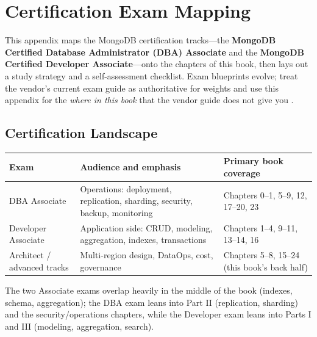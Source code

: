 \chapter{Certification Exam Mapping}
%
This appendix maps the MongoDB certification tracks---the \textbf{MongoDB Certified Database
Administrator (DBA) Associate} and the \textbf{MongoDB Certified Developer Associate}---onto the
chapters of this book, then lays out a study strategy and a self-assessment checklist. Exam
blueprints evolve; treat the vendor's current exam guide as authoritative for weights and use
this appendix for the \emph{where in this book} that the vendor guide does not give you
\cite{mongodbUniversityDocs}.

\section{Certification Landscape}
\begin{center}
\footnotesize
\begin{tabular}{@{}p{3.6cm}p{4.4cm}p{4.8cm}@{}}
\toprule
\textbf{Exam} & \textbf{Audience and emphasis} & \textbf{Primary book coverage} \\
\midrule
DBA Associate & Operations: deployment, replication, sharding, security, backup, monitoring & Chapters 0--1, 5--9, 12, 17--20, 23 \\
Developer Associate & Application side: CRUD, modeling, aggregation, indexes, transactions & Chapters 1--4, 9--11, 13--14, 16 \\
Architect / advanced tracks & Multi-region design, DataOps, cost, governance & Chapters 5--8, 15--24 (this book's back half) \\
\bottomrule
\end{tabular}
\end{center}

\noindent The two Associate exams overlap heavily in the middle of the book (indexes, schema,
aggregation); the DBA exam leans into Part II (replication, sharding) and the security/operations
chapters, while the Developer exam leans into Parts I and III (modeling, aggregation, search).

